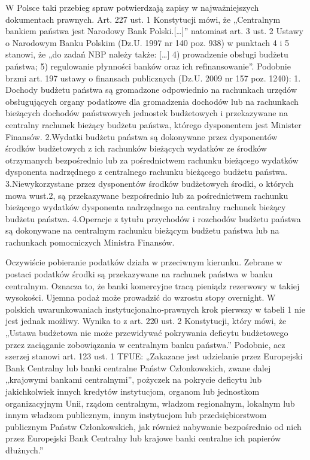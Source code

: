 \documentclass[
]{book}
\begin{document}
W Polsce taki przebieg spraw potwierdzają zapisy w najważniejszych dokumentach prawnych. Art. 227 ust. 1 Konstytucji mówi, że „Centralnym bankiem państwa jest Narodowy Bank Polski.{[}\ldots{]}'' natomiast art. 3 ust. 2 Ustawy o Narodowym Banku Polskim (Dz.U. 1997 nr 140 poz. 938) w punktach 4 i 5 stanowi, że „do zadań NBP należy także: {[}\ldots{]} 4) prowadzenie obsługi budżetu państwa; 5) regulowanie płynności banków oraz ich refinansowanie''. Podobnie brzmi art. 197 ustawy o finansach publicznych (Dz.U. 2009 nr 157 poz. 1240):
1. Dochody budżetu państwa są gromadzone odpowiednio na rachunkach urzędów obsługujących organy podatkowe dla gromadzenia dochodów lub na rachunkach bieżących dochodów państwowych jednostek budżetowych i przekazywane na centralny rachunek bieżący budżetu państwa, którego dysponentem jest Minister Finansów.
2.Wydatki budżetu państwa są dokonywane przez dysponentów środków budżetowych z ich rachunków bieżących wydatków ze środków otrzymanych bezpośrednio lub za pośrednictwem rachunku bieżącego wydatków dysponenta nadrzędnego z centralnego rachunku bieżącego budżetu państwa.
3.Niewykorzystane przez dysponentów środków budżetowych środki, o których mowa wust.2, są przekazywane bezpośrednio lub za pośrednictwem rachunku bieżącego wydatków dysponenta nadrzędnego na centralny rachunek bieżący budżetu państwa.
4.Operacje z tytułu przychodów i rozchodów budżetu państwa są dokonywane na centralnym rachunku bieżącym budżetu państwa lub na rachunkach pomocniczych Ministra Finansów.

Oczywiście pobieranie podatków działa w przeciwnym kierunku. Zebrane w postaci podatków środki są przekazywane na rachunek państwa w banku centralnym. Oznacza to, że banki komercyjne tracą pieniądz rezerwowy w takiej wysokości. Ujemna podaż może prowadzić do wzrostu stopy overnight.
W polskich uwarunkowaniach instytucjonalno-prawnych krok pierwszy w tabeli 1 nie jest jednak możliwy. Wynika to z art. 220 ust. 2 Konstytucji, który mówi, że „Ustawa budżetowa nie może przewidywać pokrywania deficytu budżetowego przez zaciąganie zobowiązania w centralnym banku państwa.'' Podobnie, acz szerzej stanowi art. 123 ust. 1 TFUE:
„Zakazane jest udzielanie przez Europejski Bank Centralny lub banki centralne Państw Członkowskich, zwane dalej „krajowymi bankami centralnymi'', pożyczek na pokrycie deficytu lub jakichkolwiek innych kredytów instytucjom, organom lub jednostkom organizacyjnym Unii, rządom centralnym, władzom regionalnym, lokalnym lub innym władzom publicznym, innym instytucjom lub przedsiębiorstwom publicznym Państw Członkowskich, jak również nabywanie bezpośrednio od nich przez Europejski Bank Centralny lub krajowe banki centralne ich papierów dłużnych.''
\end{document}

